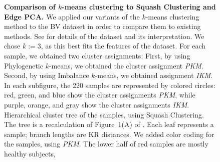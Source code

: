 \begin{figure}[!ht]
    \centering
    \begin{subfigure}{0pt}
        \label{fig:cluster_kmeans:sub:mass_tree}
    \end{subfigure}
    \begin{subfigure}{0pt}
        \label{fig:cluster_kmeans:sub:imbalance_tree}
    \end{subfigure}
    \begin{subfigure}{0pt}
        \label{fig:cluster_kmeans:sub:mds}
    \end{subfigure}
    \begin{subfigure}{0pt}
        \label{fig:cluster_kmeans:sub:pca}
    \end{subfigure}
    \begin{subfigure}{0pt}
        \label{fig:cluster_kmeans:sub:edgepca}
    \end{subfigure}
    \caption[Comparison of $k$-means clustering to Squash Clustering and Edge PCA]{
        \textbf{Comparison of $k$-means clustering to Squash Clustering and Edge PCA.}
        We applied our variants of the $k$-means clustering method
        to the \ac{BV} dataset in order to compare them to existing methods.
        See \cite{Srinivasan2012} for details of the dataset and its interpretation.
        We chose $k:=3$, as this best fits the features of the dataset.
        For each sample, we obtained two cluster assignments:
        First, by using Phylogenetic $k$-means, %
        we obtained the cluster assignment \emph{PKM}.
        Second, by using Imbalance $k$-means, we obtained assignment \emph{IKM}.
        In each subfigure, the \num{220} samples are represented by colored circles:
        red, green, and blue show the cluster assignments \emph{PKM},
        while purple, orange, and gray show the cluster assignments \emph{IKM}.
        Hierarchical cluster tree of the samples, using Squash Clustering.
        The tree is a recalculation of Figure~1(A) of \cite{Srinivasan2012}.
        Each leaf represents a sample; branch lengths are KR distances.
        We added color coding for the samples, using \emph{PKM}.
        The lower half of red samples are mostly healthy subjects,
}
\end{figure}

